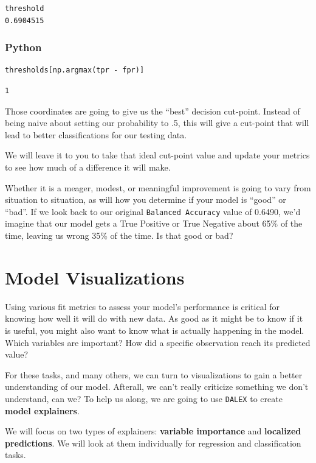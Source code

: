 \documentclass[
  letterpaper,
]{krantz}
\begin{document}
\begin{verbatim}
threshold 
0.6904515 
\end{verbatim}

\subsubsection{Python}

\begin{verbatim}
thresholds[np.argmax(tpr - fpr)]
\end{verbatim}

\begin{verbatim}
1
\end{verbatim}

Those coordinates are going to give us the ``best'' decision cut-point.
Instead of being naive about setting our probability to .5, this will
give a cut-point that will lead to better classifications for our
testing data.

We will leave it to you to take that ideal cut-point value and update
your metrics to see how much of a difference it will make.

Whether it is a meager, modest, or meaningful improvement is going to
vary from situation to situation, as will how you determine if your
model is ``good'' or ``bad''. If we look back to our original
\texttt{Balanced\ Accuracy} value of 0.6490, we'd imagine that our model
gets a True Positive or True Negative about 65\% of the time, leaving us
wrong 35\% of the time. Is that good or bad?

\section{Model Visualizations}\label{model-visualizations}

Using various fit metrics to assess your model's performance is critical
for knowing how well it will do with new data. As good as it might be to
know if it is useful, you might also want to know what is actually
happening in the model. Which variables are important? How did a
specific observation reach its predicted value?

For these tasks, and many others, we can turn to visualizations to gain
a better understanding of our model. Afterall, we can't really criticize
something we don't understand, can we? To help us along, we are going to
use \texttt{DALEX} to create \textbf{model explainers}.

We will focus on two types of explainers: \textbf{variable importance}
and \textbf{localized predictions}. We will look at them individually
for regression and classification tasks.
\end{document}
